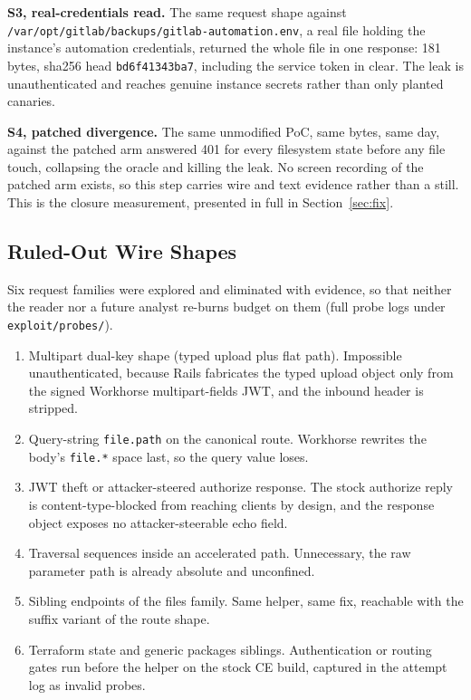 \documentclass[journal]{IEEEtran}
\begin{document}
\textbf{S3, real-credentials read.} The same request shape against
\texttt{/\hspace{0pt}var/\hspace{0pt}opt/\hspace{0pt}gitlab/\hspace{0pt}backups/\hspace{0pt}gitlab-automation.env},
a real file holding the instance's automation credentials, returned the
whole file in one response: 181 bytes, sha256 head
\texttt{bd6f41343ba7}, including the service token in clear. The leak is
unauthenticated and reaches genuine instance secrets rather than only
planted canaries.

\textbf{S4, patched divergence.} The same unmodified PoC, same bytes, same
day, against the patched arm answered 401 for every filesystem state before
any file touch, collapsing the oracle and killing the leak. No screen recording
of the patched arm exists, so this step carries wire and text evidence rather
than a still. This is the closure measurement, presented in full in
Section~\ref{sec:fix}.

\subsection{Ruled-Out Wire Shapes}

Six request families were explored and eliminated with evidence, so that
neither the reader nor a future analyst re-burns budget on them (full probe
logs under \texttt{exploit/probes/}).

\begin{enumerate}
\item Multipart dual-key shape (typed upload plus flat path). Impossible
unauthenticated, because Rails fabricates the typed upload object only from
the signed Workhorse multipart-fields JWT, and the inbound header is stripped.
\item Query-string \texttt{file.path} on the canonical route. Workhorse
rewrites the body's \texttt{file.*} space last, so the query value loses.
\item JWT theft or attacker-steered authorize response. The stock authorize
reply is content-type-blocked from reaching clients by design, and the
response object exposes no attacker-steerable echo field.
\item Traversal sequences inside an accelerated path. Unnecessary, the raw
parameter path is already absolute and unconfined.
\item Sibling endpoints of the files family. Same helper, same fix, reachable
with the suffix variant of the route shape.
\item Terraform state and generic packages siblings. Authentication or routing
gates run before the helper on the stock CE build, captured in the attempt
log as invalid probes.
\end{enumerate}
\end{document}

